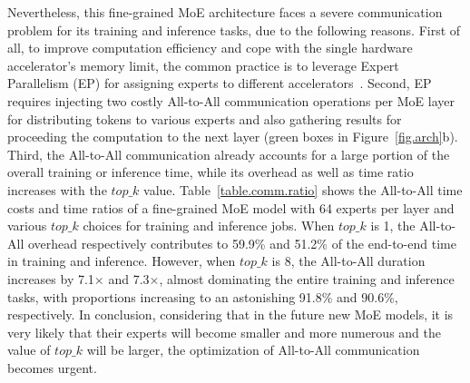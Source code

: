 Nevertheless, this fine-grained MoE architecture faces a severe communication problem for its training and inference tasks, due to the following reasons. 
First of all, to improve computation efficiency and cope with the single hardware accelerator's memory limit, the common practice is to leverage Expert Parallelism (EP) for assigning experts to different accelerators~\cite{fedus2022switch}. 
Second, EP requires injecting two costly All-to-All communication operations per MoE layer for distributing tokens to various experts and also gathering results for proceeding the computation to the next layer (green boxes in Figure~\ref{fig.arch}b). 
Third, the All-to-All communication already accounts for a large portion of the overall training or inference time, while its overhead as well as time ratio increases with the $top\_k$ value. 
Table~\ref{table.comm.ratio} shows the All-to-All time costs and time ratios of a fine-grained MoE model with 64 experts per layer and various $top\_k$ choices for training and inference jobs. 
When $top\_k$ is 1, the All-to-All overhead respectively contributes to 59.9\% and 51.2\% of the end-to-end time in training and inference. 
However, when $top\_k$ is 8, the All-to-All duration increases by 7.1$\times$ and 7.3$\times$, almost dominating the entire training and inference tasks, with proportions increasing to an astonishing 91.8\% and 90.6\%, respectively. 
In conclusion, considering that in the future new MoE models, it is very likely that their experts will become smaller and more numerous and the value of $top\_k$ will be larger, the optimization of All-to-All communication becomes urgent.



